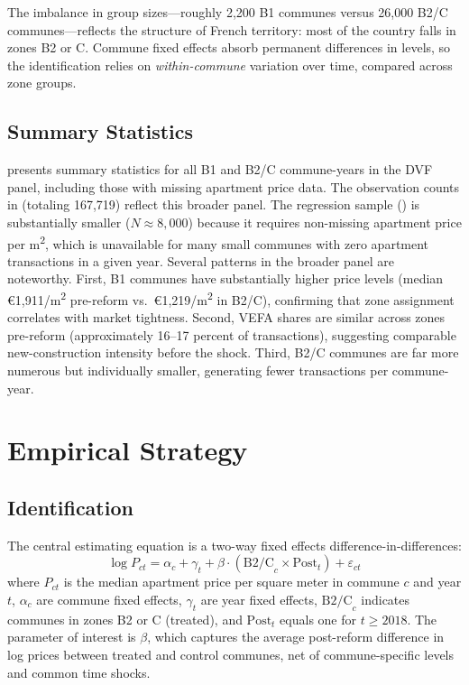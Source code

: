 \documentclass[12pt]{article}
\begin{document}
The imbalance in group sizes---roughly 2,200 B1 communes versus 26,000 B2/C communes---reflects the structure of French territory: most of the country falls in zones B2 or C. Commune fixed effects absorb permanent differences in levels, so the identification relies on \textit{within-commune} variation over time, compared across zone groups.

\subsection{Summary Statistics}

 presents summary statistics for all B1 and B2/C commune-years in the DVF panel, including those with missing apartment price data. The observation counts in  (totaling 167,719) reflect this broader panel. The regression sample () is substantially smaller ($N \approx 8{,}000$) because it requires non-missing apartment price per m\textsuperscript{2}, which is unavailable for many small communes with zero apartment transactions in a given year. Several patterns in the broader panel are noteworthy. First, B1 communes have substantially higher price levels (median \euro{1,911}/m\textsuperscript{2} pre-reform vs.\ \euro{1,219}/m\textsuperscript{2} in B2/C), confirming that zone assignment correlates with market tightness. Second, VEFA shares are similar across zones pre-reform (approximately 16--17 percent of transactions), suggesting comparable new-construction intensity before the shock. Third, B2/C communes are far more numerous but individually smaller, generating fewer transactions per commune-year.




\section{Empirical Strategy}

\subsection{Identification}

The central estimating equation is a two-way fixed effects difference-in-differences:
\begin{equation}\label{eq:did}
\log P_{ct} = \alpha_c + \gamma_t + \beta \cdot (\text{B2/C}_c \times \text{Post}_t) + \varepsilon_{ct}
\end{equation}
where $P_{ct}$ is the median apartment price per square meter in commune $c$ and year $t$, $\alpha_c$ are commune fixed effects, $\gamma_t$ are year fixed effects, $\text{B2/C}_c$ indicates communes in zones B2 or C (treated), and $\text{Post}_t$ equals one for $t \geq 2018$. The parameter of interest is $\beta$, which captures the average post-reform difference in log prices between treated and control communes, net of commune-specific levels and common time shocks.
\end{document}
